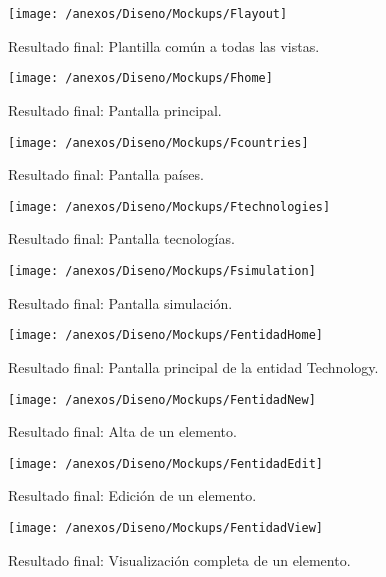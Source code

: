 
\begin{figure}[h]
	\centering
	\texttt{[image: /anexos/Diseno/Mockups/Flayout]}
	\caption{Resultado final: Plantilla común a todas las vistas.}
	\label{img:Flayout}
\end{figure}

\begin{figure}[h]
	\centering
	\texttt{[image: /anexos/Diseno/Mockups/Fhome]}
	\caption{Resultado final: Pantalla principal.}
	\label{img:Fhome}
\end{figure}

\begin{figure}[h]
	\centering
	\texttt{[image: /anexos/Diseno/Mockups/Fcountries]}
	\caption{Resultado final: Pantalla países.}
	\label{img:Fcountries}
\end{figure}

\begin{figure}[h]
	\centering
	\texttt{[image: /anexos/Diseno/Mockups/Ftechnologies]}
	\caption{Resultado final: Pantalla tecnologías.}
	\label{img:Ftechnologies}
\end{figure}

\begin{figure}[h]
	\centering
	\texttt{[image: /anexos/Diseno/Mockups/Fsimulation]}
	\caption{Resultado final: Pantalla simulación.}
	\label{img:Fsimulation}
\end{figure}

\begin{figure}[h]
	\centering
	\texttt{[image: /anexos/Diseno/Mockups/FentidadHome]}
	\caption{Resultado final: Pantalla principal de la entidad Technology.}
	\label{img:FentidadHome}
\end{figure}

\begin{figure}[h]
	\centering
	\texttt{[image: /anexos/Diseno/Mockups/FentidadNew]}
	\caption{Resultado final: Alta de un elemento.}
	\label{img:FentidadNew}
\end{figure}

\begin{figure}[h]
	\centering
	\texttt{[image: /anexos/Diseno/Mockups/FentidadEdit]}
	\caption{Resultado final: Edición de un elemento.}
	\label{img:FentidadEdit}
\end{figure}

\begin{figure}[h]
	\centering
	\texttt{[image: /anexos/Diseno/Mockups/FentidadView]}
	\caption{Resultado final: Visualización completa de un elemento.}
	\label{img:FentidadView}
\end{figure}

